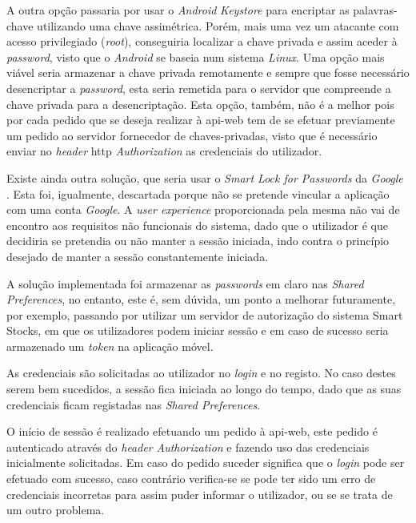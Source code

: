 A outra opção passaria por usar o \textit{Android} \textit{Keystore} para encriptar as palavras-chave utilizando uma chave assimétrica. Porém, mais uma vez um atacante com acesso privilegiado (\textit{root}), conseguiria localizar a chave privada e assim aceder à \textit{password}, visto que o \textit{Android} se baseia num sistema \textit{Linux}. Uma opção mais viável seria armazenar a chave privada remotamente e sempre que fosse necessário desencriptar a \textit{password}, esta seria remetida para o servidor que compreende a chave privada para a desencriptação. Esta opção, também, não é a melhor pois por cada pedido que se deseja realizar à \gls{api-web} tem de se efetuar previamente um pedido ao servidor fornecedor de chaves-privadas, visto que é necessário enviar no \textit{header} \acrfull{http} \textit{Authorization} as credenciais do utilizador.

Existe ainda outra solução, que seria usar o \textit{Smart Lock for Passwords} da \textit{Google} \cite{SmartLock:android}. Esta foi, igualmente, descartada porque não se pretende vincular a aplicação com uma conta \textit{Google}. A \textit{user experience} proporcionada pela mesma não vai de encontro aos requisitos não funcionais do sistema, dado que o utilizador é que decidiria se pretendia ou não manter a sessão iniciada, indo contra o princípio desejado de manter a sessão constantemente iniciada.

A solução implementada foi armazenar as \textit{passwords} em claro nas \textit{Shared Preferences}, no entanto, este é, sem dúvida, um ponto a melhorar futuramente, por exemplo, passando por utilizar um servidor de autorização do sistema Smart Stocks, em que os utilizadores podem iniciar sessão e em caso de sucesso seria armazenado um \textit{token} na aplicação móvel.

As credenciais são solicitadas ao utilizador no \textit{login} e no registo. No caso destes serem bem sucedidos, a sessão fica iniciada ao longo do tempo, dado que as suas credenciais ficam registadas nas \textit{Shared Preferences}.

O início de sessão é realizado efetuando um pedido à \gls{api-web}, este pedido é autenticado através do \textit{header} \textit{Authorization} e fazendo uso das credenciais inicialmente solicitadas. Em caso do pedido suceder significa que o \textit{login} pode ser efetuado com sucesso, caso contrário verifica-se se pode ter sido um erro de credenciais incorretas para assim puder informar o utilizador, ou se se trata de um outro problema.

